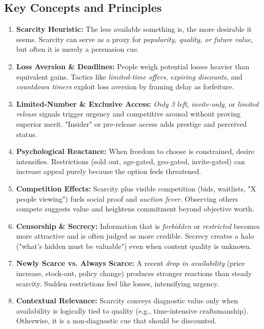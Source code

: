 \subsection*{Key Concepts and Principles}
\begin{enumerate}
    \item \textbf{Scarcity Heuristic:} The less available something is, the more desirable it seems. Scarcity can serve as a proxy for \emph{popularity, quality, or future value}, but often it is merely a persuasion cue.

    \item \textbf{Loss Aversion \& Deadlines:} People weigh potential losses heavier than equivalent gains. Tactics like \emph{limited-time offers}, \emph{expiring discounts}, and \emph{countdown timers} exploit loss aversion by framing delay as forfeiture.

    \item \textbf{Limited-Number \& Exclusive Access:} \emph{Only 3 left}, \emph{invite-only}, or \emph{limited release} signals trigger urgency and competitive arousal without proving superior merit. "Insider" or pre-release access adds prestige and perceived status.

    \item \textbf{Psychological Reactance:} When freedom to choose is constrained, desire intensifies. Restrictions (sold out, age-gated, geo-gated, invite-gated) can increase appeal purely because the option feels threatened.

    \item \textbf{Competition Effects:} Scarcity plus visible competition (bids, waitlists, "X people viewing") fuels social proof and \emph{auction fever}. Observing others compete suggests value and heightens commitment beyond objective worth.

    \item \textbf{Censorship \& Secrecy:} Information that is \emph{forbidden} or \emph{restricted} becomes more attractive and is often judged as more credible. Secrecy creates a halo ("what’s hidden must be valuable") even when content quality is unknown.

    \item \textbf{Newly Scarce vs. Always Scarce:} A recent \emph{drop in availability} (price increase, stock-out, policy change) produces stronger reactions than steady scarcity. Sudden restrictions feel like losses, intensifying urgency.

    \item \textbf{Contextual Relevance:} Scarcity conveys diagnostic value only when availability is logically tied to quality (e.g., time-intensive craftsmanship). Otherwise, it is a non-diagnostic cue that should be discounted.
\end{enumerate}

